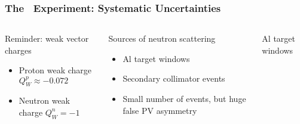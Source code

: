 \begin{frame}
 \frametitle{The \Qweak\ Experiment: Systematic Uncertainties}
 \begin{columns}[T]
   \begin{block}{Reminder: weak vector charges}
    \begin{itemize}
     \item Proton weak charge $Q^p_W \approx -0.072$
     \item Neutron weak charge $Q^n_W = -1$
    \end{itemize}
   \end{block}
   \begin{block}{Sources of neutron scattering}
    \begin{itemize}
     \item Al target windows
     \item Secondary collimator events
     \item Small number of events, but huge false PV asymmetry
    \end{itemize}
   \end{block}
   \begin{block}{Al target windows}
    \begin{center}
    \end{center}
   \end{block}
 \end{columns}
\end{frame}

